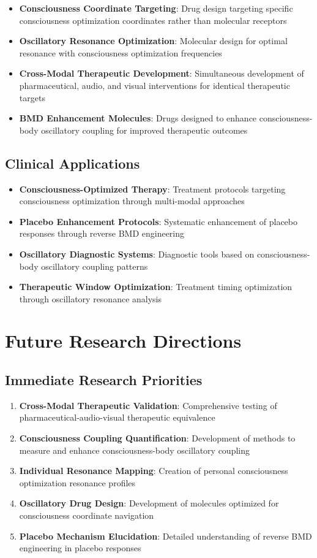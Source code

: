 \documentclass[12pt,a4paper]{article}
\begin{document}
\begin{itemize}
\item \textbf{Consciousness Coordinate Targeting}: Drug design targeting specific consciousness optimization coordinates rather than molecular receptors
\item \textbf{Oscillatory Resonance Optimization}: Molecular design for optimal resonance with consciousness optimization frequencies
\item \textbf{Cross-Modal Therapeutic Development}: Simultaneous development of pharmaceutical, audio, and visual interventions for identical therapeutic targets
\item \textbf{BMD Enhancement Molecules}: Drugs designed to enhance consciousness-body oscillatory coupling for improved therapeutic outcomes
\end{itemize}

\subsection{Clinical Applications}

\begin{itemize}
\item \textbf{Consciousness-Optimized Therapy}: Treatment protocols targeting consciousness optimization through multi-modal approaches
\item \textbf{Placebo Enhancement Protocols}: Systematic enhancement of placebo responses through reverse BMD engineering
\item \textbf{Oscillatory Diagnostic Systems}: Diagnostic tools based on consciousness-body oscillatory coupling patterns
\item \textbf{Therapeutic Window Optimization}: Treatment timing optimization through oscillatory resonance analysis
\end{itemize}

\section{Future Research Directions}

\subsection{Immediate Research Priorities}

\begin{enumerate}
\item \textbf{Cross-Modal Therapeutic Validation}: Comprehensive testing of pharmaceutical-audio-visual therapeutic equivalence
\item \textbf{Consciousness Coupling Quantification}: Development of methods to measure and enhance consciousness-body oscillatory coupling
\item \textbf{Individual Resonance Mapping}: Creation of personal consciousness optimization resonance profiles
\item \textbf{Oscillatory Drug Design}: Development of molecules optimized for consciousness coordinate navigation
\item \textbf{Placebo Mechanism Elucidation}: Detailed understanding of reverse BMD engineering in placebo responses
\end{enumerate}
\end{document}
